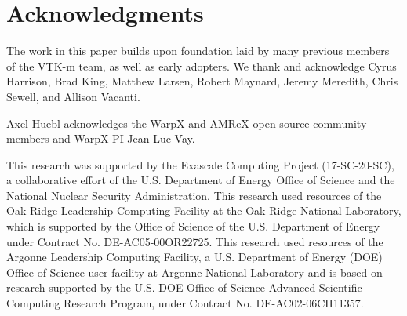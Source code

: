 \section{Acknowledgments}


The work in this paper builds upon foundation laid by many previous members of the VTK-m team, as well as early adopters.  We thank and acknowledge
Cyrus Harrison, 
Brad King, 
Matthew Larsen,
Robert Maynard, 
Jeremy Meredith, 
Chris Sewell, 
and
Allison Vacanti.

Axel Huebl acknowledges the WarpX and AMReX open source community members and WarpX PI Jean-Luc Vay.

This research was supported by the Exascale Computing Project (17-SC-20-SC), a collaborative effort of the U.S. Department of Energy Office of Science and the National Nuclear Security Administration.
This research used resources of the Oak Ridge Leadership Computing Facility at the Oak Ridge National Laboratory, which is supported by the Office of Science of the U.S. Department of Energy under Contract No. DE-AC05-00OR22725.
This research used resources of the Argonne Leadership Computing Facility, a U.S. Department of Energy (DOE) Office of Science user facility at Argonne National Laboratory and is based on research supported by the U.S. DOE Office of Science-Advanced Scientific Computing Research Program, under Contract No. DE-AC02-06CH11357.
